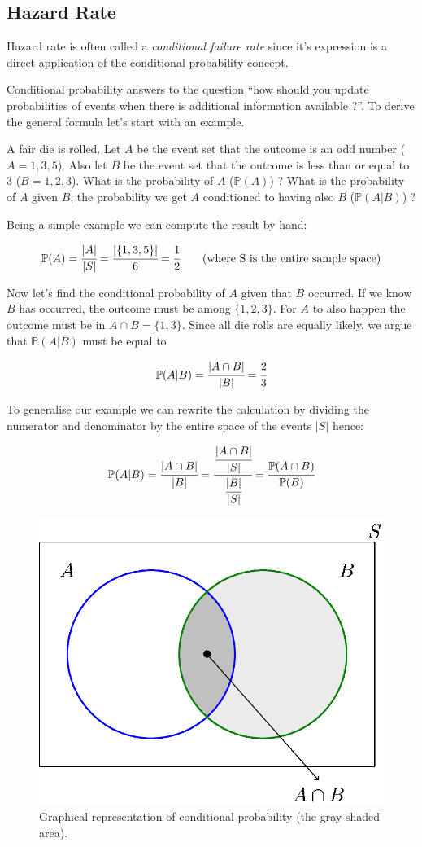 \subsection{Hazard Rate}\label{hazard-rate}

Hazard rate is often called a \emph{conditional failure rate} since it's
expression is a direct application of the conditional probability
concept.

Conditional probability answers to the question ``how should you update
probabilities of events when there is additional information available
?''. To derive the general formula let's start with an example.

A fair die is rolled. Let \(A\) be the event set that the outcome is an odd
number (\(A={1,3,5}\)). Also let \(B\) be the event set that the outcome is
less than or equal to \(3\) (\(B={1,2,3}\)). What is the probability of
\(A\) (\(\mathbb{P}(A)\)) ? What is the probability of \(A\) given \(B\), the probability we get $A$ conditioned to having also $B$
(\(\mathbb{P}(A|B)\)) ?

Being a simple example we can compute the result by hand:

\[\mathbb{P}(A) = \cfrac{|A|}{|S|} = \cfrac{|\{1,3,5\}|}{6} = \cfrac{1}{2}\qquad\textrm{(where S is the entire sample space)}\]

Now let's find the conditional probability of \(A\) given that \(B\)
occurred. If we know \(B\) has occurred, the outcome must be among
\(\{1,2,3\}\). For \(A\) to also happen the outcome must be in
\(A\cap B = \{1,3\}\). Since all die rolls are equally likely, we argue
that \(\mathbb{P}(A|B)\) must be equal to

\[\mathbb{P}(A|B) = \cfrac{|A\cap B|}{|B|} = \cfrac{2}{3}\]

To generalise our example we can rewrite the calculation by dividing the
numerator and denominator by the entire space of the events \(|S|\)
hence:

\[\mathbb{P}(A|B) = \cfrac{|A\cap B|}{|B|} = \cfrac{\cfrac{|A\cap B|}{|S|}}{\cfrac{|B|}{|S|}} = \cfrac{\mathbb{P}(A\cap B)}{\mathbb{P}(B)}\]

\begin{figure}[tb]
\centering
\includegraphics[width=0.7\linewidth]{conditional_b.png}
\caption{Graphical representation of conditional probability (the gray shaded area).}
\end{figure}

